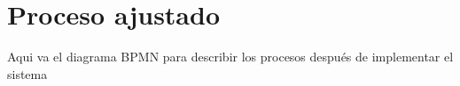 \section{Proceso ajustado}


Aqui va el diagrama BPMN para describir los procesos después de implementar el sistema
